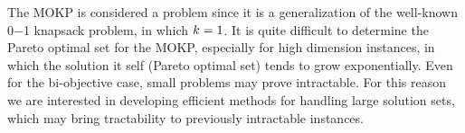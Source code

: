 The MOKP is considered a \nphard{} problem since it is a generalization
of the well-known 0$-$1 knapsack problem, in which $k = 1$.
It is quite difficult to determine the Pareto optimal set for the MOKP,
especially for high dimension instances, in which the solution it self
(Pareto optimal set) tends to grow exponentially.
Even for the bi-objective case, small problems may prove intractable.
For this reason we are interested in developing efficient methods for
handling large solution sets, which may bring tractability to previously
intractable instances.


